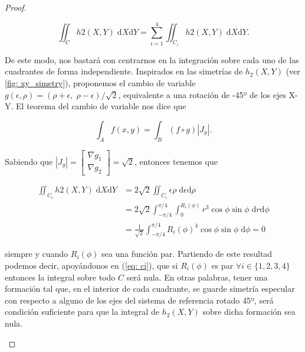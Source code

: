 \begin{proof}
\begin{enumerate}
    \begin{equation} \label{eq: ci}
    \iint_{C} h2(X,Y) \; \mathrm{d}X \mathrm{d}Y = \sum^4_{i=1} \iint_{C_i} h2(X,Y) \; \mathrm{d}X \mathrm{d}Y.
    \end{equation}

    De este modo, nos bastará con centrarnos en la integración sobre cada uno de las cuadrantes de forma independiente. Inspirados en las simetrías de $h_2(X,Y)$ (ver \autoref{fig: xy_simetry}), proponemos el cambio de variable $g(\epsilon, \rho) = (\rho + \epsilon, \; \rho - \epsilon)/\sqrt{2}$, equivalente a una rotación de -45º de los ejes X-Y. El teorema del cambio de variable nos dice que
    
    \begin{equation} \label{eq: teorem_cv}
    \int_{A} f(x,y) = \int_{B} (f \circ g) |J_g|. 
    \end{equation}

    Sabiendo que $|J_g| = \begin{bmatrix}\nabla g_1 \\ \nabla g_2 \end{bmatrix} = \sqrt{2}$, entonces tenemos que
    
    \begin{align*}
    \iint_{C_i} h2(X,Y) \; \mathrm{d}X \mathrm{d}Y 
    & = 2 \sqrt{2} \iint_{C_i} \epsilon\rho \; \mathrm{d}\epsilon \mathrm{d}\rho \\
    & = 2 \sqrt{2} \int_{-\pi/4}^{\pi/4}\int_0^{R_i(\phi)} r^3 \cos\phi\sin\phi \; \mathrm{d}r \mathrm{d}\phi \\
    & = \frac{1}{\sqrt{2}} \int_{-\pi/4}^{\pi/4} R_i(\phi)^4 \cos\phi\sin\phi \; \mathrm{d}\phi
    = 0
    \end{align*}
    
    siempre y cuando $R_i(\phi)$ sea una función par. Partiendo de este resultad podemos decir, apoyándonos en (\ref{eq: ci}), que si $R_i(\phi)$ es par $\forall i \in \{1,2,3,4\}$ entonces la integral sobre todo $C$ será nula. En otras palabras, tener una formación tal que, en el interior de cada cuadrante, se guarde simetría especular con respecto a alguno de los ejes del sistema de referencia rotado 45º, será condición suficiente para que la integral de $h_2(X,Y)$ sobre dicha formación sea nula.
\end{enumerate}


\end{proof}
